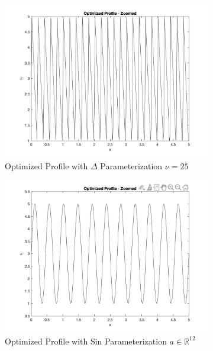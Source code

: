 \documentclass{article}
\begin{document}
\begin{figure}[h]
\centering
\begin{subfigure}[b]{0.45\textwidth}
\centering
\includegraphics[width = \textwidth]{OptZoomed_Freq25}
\caption{Optimized Profile with $\Delta$ Parameterization $\nu = 25$}
\label{fig: 25nu starting point}
\end{subfigure}
\hfill
\begin{subfigure}[b]{0.45\textwidth}
\centering
\includegraphics[width = \textwidth]{opt_zoomed_pt1_tri}
\caption{Optimized Profile with Sin Parameterization $a\in \mathbb{R}^{12}$}
\label{fig: 12 dim sin}
\end{subfigure}
\begin{subfigure}[b]{0.45\textwidth}

\end{subfigure}
\end{figure}
\end{document}
